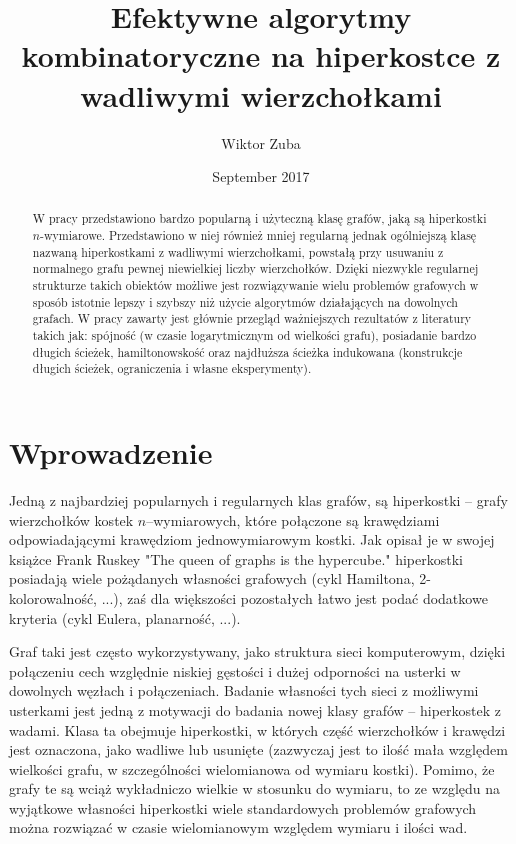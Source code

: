 \documentclass{pracamgr}
\author{Wiktor Zuba}
\title{Efektywne algorytmy kombinatoryczne na hiperkostce z wadliwymi wierzchołkami}
\date{September 2017}
\begin{document}
\maketitle

\begin{abstract}
W pracy przedstawiono bardzo popularną i użyteczną klasę grafów, jaką są hiperkostki $n$-wymiarowe. Przedstawiono w niej również mniej regularną jednak
ogólniejszą klasę nazwaną hiperkostkami z wadliwymi wierzchołkami, powstałą przy usuwaniu z normalnego grafu pewnej niewielkiej liczby wierzchołków.
Dzięki niezwykle regularnej strukturze takich obiektów możliwe jest rozwiązywanie wielu problemów grafowych w sposób istotnie lepszy i szybszy niż
użycie algorytmów działających na dowolnych grafach.
W pracy zawarty jest głównie przegląd ważniejszych rezultatów z literatury takich jak:
spójność (w czasie logarytmicznym od wielkości grafu), posiadanie bardzo długich ścieżek, hamiltonowskość
oraz najdłuższa ścieżka indukowana (konstrukcje długich ścieżek, ograniczenia i własne eksperymenty).
\end{abstract}


\tableofcontents

 \chapter*{Wprowadzenie}
  Jedną z najbardziej popularnych i regularnych klas grafów, są hiperkostki -- grafy wierzchołków kostek $n$--wymiarowych,
  które połączone są krawędziami odpowiadającymi krawędziom jednowymiarowym kostki.
  Jak opisał je w swojej książce \cite{Ruskey} Frank Ruskey "The queen of graphs is the hypercube." hiperkostki posiadają
  wiele pożądanych własności grafowych (cykl Hamiltona, 2-kolorowalność, ...),
  zaś dla większości pozostałych łatwo jest podać dodatkowe kryteria (cykl Eulera, planarność, ...).
  
  Graf taki jest często wykorzystywany, jako struktura sieci komputerowym, dzięki połączeniu cech względnie niskiej gęstości i dużej odporności na usterki
  w dowolnych węzłach i połączeniach.
  Badanie własności tych sieci z możliwymi usterkami jest jedną z motywacji do badania nowej klasy grafów -- hiperkostek z wadami.
  Klasa ta obejmuje hiperkostki, w których część wierzchołków i krawędzi jest oznaczona, jako wadliwe lub usunięte
  (zazwyczaj jest to ilość mała względem wielkości grafu, w szczególności wielomianowa od wymiaru kostki).  
  Pomimo, że grafy te są wciąż wykładniczo wielkie w stosunku do wymiaru, to ze względu na wyjątkowe własności hiperkostki wiele standardowych
  problemów grafowych można rozwiązać w czasie wielomianowym względem wymiaru i ilości wad.
  
\end{document}

